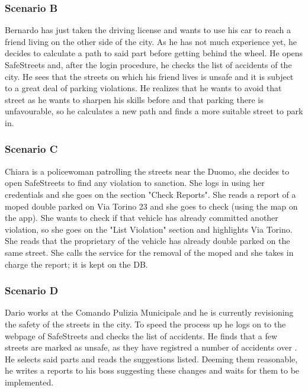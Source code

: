 \subsubsection*{Scenario B}

Bernardo has just taken the driving license and wants to use his car to reach 
a friend living on the other side of the city. As he has not much experience 
yet, he decides to calculate a path to said part before getting behind the 
wheel. He opens SafeStreets and, after the login procedure, he checks the 
list of accidents of the city. He sees that the streets on which his friend 
lives is unsafe and it is subject to a great deal of parking violations. 
He realizes that he wants to avoid that street as he wants to sharpen his skills 
before and that parking there is unfavourable, so he calculates a new path and 
finds a more suitable street to park in.

\subsubsection*{Scenario C}

Chiara is a policewoman patrolling the streets near the Duomo, she decides to 
open SafeStreets to find any violation to sanction. She logs in using her 
credentials and she goes on the section "Check Reports". She reads a report 
of a moped double parked on Via Torino 23 and she goes to check (using the map 
on the app). She wants to check if that vehicle has already committed another 
violation, so she goes on the "List Violation" section and highlights Via Torino. 
She reads that the proprietary of the vehicle has already double parked on the same 
street. She calls the service for the removal of the moped and she takes in charge 
the report; it is kept on the DB.

\subsubsection*{Scenario D}

Dario works at the Comando Pulizia Municipale and he is currently revisioning the safety 
of the streets in the city. To speed the process up he logs on to the webpage of 
SafeStreets and checks the list of accidents. He finds that a few streets are marked as 
unsafe, as they have registred a number of accidents over \tres . He selects said parts 
and reads the suggestions listed. Deeming them reasonable, he writes a reports to his 
boss suggesting these changes and waits for them to be implemented.

